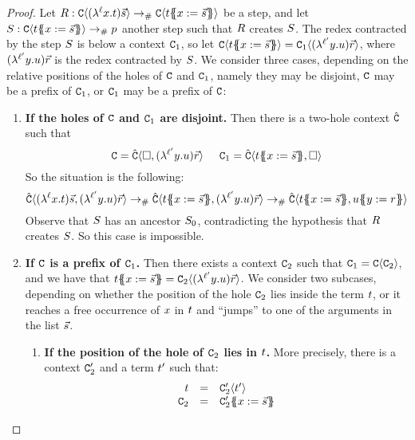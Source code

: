\begin{proof}
Let $R : \mathtt{C}\langle(\lambda^{\ell} x. t)\vec{s}\rangle \mathrel{\to_{\mathtt{\#}}} \mathtt{C}\langle t\{\!\!\{x := \vec{s}\}\!\!\}\rangle$ be a step,
and let $S : \mathtt{C}\langle t\{\!\!\{x := \vec{s}\}\!\!\}\rangle \mathrel{\to_{\mathtt{\#}}} p$ another step
such that $R$ creates $S$.
The redex contracted by the step $S$ is below a context $\mathtt{C}_1$,
so let $\mathtt{C}\langle t\{\!\!\{x := \vec{s}\}\!\!\}\rangle = \mathtt{C}_1\langle(\lambda^{\ell'} y. u)\vec{r}\rangle$,
where $(\lambda^{\ell'} y. u)\vec{r}$ is the redex contracted by $S$.
We consider three cases, depending on the relative positions of the holes of $\mathtt{C}$ and $\mathtt{C}_1$,
namely they may be disjoint,
$\mathtt{C}$ may be a prefix of $\mathtt{C}_1$,
or $\mathtt{C}_1$ may be a prefix of $\mathtt{C}$:
\begin{enumerate}
\item {\bf If the holes of $\mathtt{C}$ and $\mathtt{C}_1$ are disjoint.}
  Then there is a two-hole context $\hat{\mathtt{C}}$ such that
  \[
    \mathtt{C} = \hat{\mathtt{C}}\langle\Box,(\lambda^{\ell'} y. u)\vec{r}\rangle
    \hspace{.5cm}
    \mathtt{C}_1 = \hat{\mathtt{C}}\langle t\{\!\!\{x := \vec{s}\}\!\!\},\Box\rangle
  \]
  So the situation is the following:
  \[
    \conhat\of{(\lamp{\lab}{\var}{\tm})\ls{\tmtwo},(\lamp{\labtwo}{\vartwo}{\tmthree})\ls{\tmfour}}
    \todist \conhat\of{\tm\sub{\var}{\ls{\tmtwo}},(\lamp{\labtwo}{\vartwo}{\tmthree})\ls{\tmfour}}
    \todist \conhat\of{\tm\sub{\var}{\ls{\tmtwo}},\tmthree\sub{\vartwo}{\tmfour}}
  \]
  Observe that $S$ has an ancestor $S_0$, contradicting the hypothesis that $R$ creates $S$.
  So this case is impossible.
\item {\bf If $\mathtt{C}$ is a prefix of $\mathtt{C}_1$.}
  Then there exists a context $\mathtt{C}_2$ such that $\mathtt{C}_1 = \mathtt{C}\langle\mathtt{C}_2\rangle$,
  and we have that
  $t\{\!\!\{x := \vec{s}\}\!\!\} = \mathtt{C}_2\langle(\lambda^{\ell'} y. u)\vec{r}\rangle$.
  We consider two subcases, depending on whether the position of the hole $\mathtt{C}_2$ lies
  inside the term $t$, or it reaches a free occurrence of $x$ in $t$
  and ``jumps'' to one of the arguments in the list $\vec{s}$.
  \begin{enumerate}
  \item {\bf If the position of the hole of $\mathtt{C}_2$ lies in $t$.}
    More precisely, there is a context $\mathtt{C}'_2$ and a term $t'$ such that:
    \[
      \begin{array}{rcl}
      t & = & \mathtt{C}'_2\langle t'\rangle \\
      \mathtt{C}_2 & = & \mathtt{C}'_2\{\!\!\{x := \vec{s}\}\!\!\} \\

\end{array}\]
\end{enumerate}
\end{enumerate}
\end{proof}
